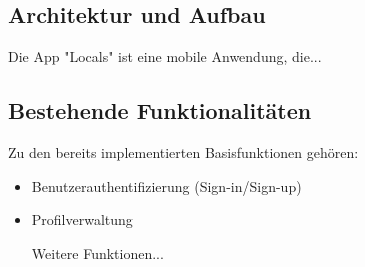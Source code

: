 \subsection{Architektur und Aufbau}
Die App "Locals" ist eine mobile Anwendung, die...

\subsection{Bestehende Funktionalitäten}
Zu den bereits implementierten Basisfunktionen gehören:
\begin{itemize}
    \item Benutzerauthentifizierung (Sign-in/Sign-up)
    \item Profilverwaltung
    \item [Weitere Funktionen...]
\end{itemize} 